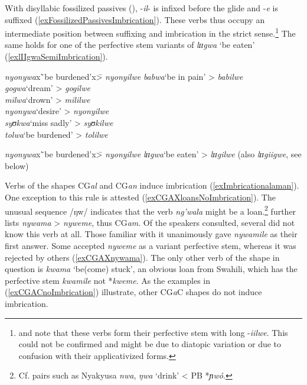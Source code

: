 \largerpage
With disyllabic fossilized passives (), -\textit{il}- is infixed before the glide and -\textit{e} is suffixed (\ref{exFossilizedPassivesImbrication}). These verbs thus occupy an intermediate position between suffixing and imbrication in the strict sense.\footnote{\citet{SchumannK1899} and \citet{BergerP1938} note that these verbs form their perfective stem with long -\textit{iilwe}. This could not be confirmed and might be due to diatopic variation or due to confusion with their applicativized forms.} The same holds for one of the perfective stem variants of \textit{lɪɪgwa} \lq be eaten' (\ref{exlIIgwaSemiImbrication}).
\begin{exe}
\ex\label{exFossilizedPassivesImbrication}
\begin{tabbing}
\textit{nyonywa}x\=`be burdened'x\= > \textit{nyonyilwe}\kill
\textit{babwa}\>`be in pain'\> > \textit{babilwe}\\ 
\textit{gogwa}\>`dream'\> > \textit{gogilwe}\\
\textit{milwa}\>`drown'\> > \textit{mililwe}\\
\textit{nyonywa}\>`desire'\> > \textit{nyonyilwe}\\
\textit{syʊkwa}\>`miss sadly'\> > \textit{syʊkilwe}\\
\textit{tolwa}\>`be burdened'\> > \textit{tolilwe}
\end{tabbing}
\ex \label{exlIIgwaSemiImbrication}
\begin{tabbing}
\textit{nyonywa}x\=`be burdened'x\= > \textit{nyonyilwe}\kill
\textit{lɪɪgwa}\>`be eaten'\> > \textit{lɪɪgilwe} (also \textit{lɪɪgiigwe}, see below)
\end{tabbing}
\end{exe}

Verbs of the shapes CG\textit{al} and CG\textit{an} induce imbrication (\ref{exImbricationalaman}). One exception to this rule is attested (\ref{exCGAXloansNoImbrication}). The unusual sequence /ŋw/ indicates that the verb \textit{ng'wala} might be a  loan.\footnote{Cf. pairs such as Nyakyusa \textit{nwa},  \textit{ŋwa} \lq drink' < PB *\textit{ɲwó}.} \citet{BergerP1938} further lists \textit{nywama} > \textit{nyweme}, thus CG\textit{am}. Of the speakers consulted, several did not know this verb at all. Those familiar with it unanimously gave \textit{nywamile} as their first answer. Some accepted \textit{nyweme} as a variant perfective stem, whereas it was rejected by others (\ref{exCGAXnywama}). The only other verb of the shape in question is \textit{kwama} \lq be(come) stuck', an obvious loan from Swahili, which has the perfective stem \textit{kwamile}  not *\textit{kweme}. As the examples in (\ref{exCGACnoImbrication}) illustrate, other CG\textit{a}C shapes do not induce imbrication.

